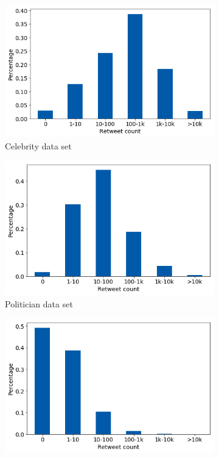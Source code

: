 \begin{figure}[h]
\centering
\begin{subfigure}{.45\textwidth}
  \centering
  \includegraphics[width=.95\linewidth]{img/celeb_retw_distr}
  \caption{Celebrity data set}
  \label{fig:retw_distr_sub1}
\end{subfigure}%
\begin{subfigure}{.45\textwidth}
  \centering
  \includegraphics[width=.95\linewidth]{img/polit_retw_distr}
  \caption{Politician data set}
  \label{fig:retw_distr_sub2}
\end{subfigure}
\begin{subfigure}{.45\textwidth}
  \centering
  \includegraphics[width=.95\linewidth]{img/corp_retw_distr}

\end{subfigure}
\end{figure}
